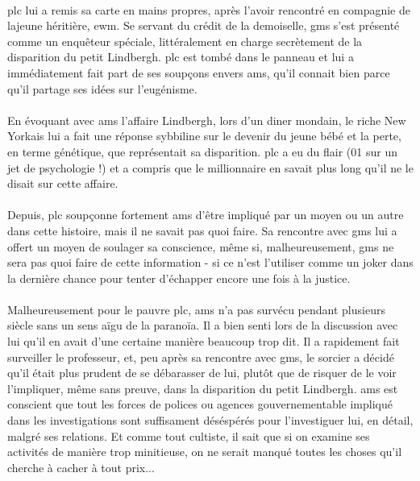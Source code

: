 \paragraph{} \gls{plc} lui a remis sa carte en mains propres, après l'avoir rencontré en compagnie de lajeune héritière, \gls{ewm}. Se 
servant du crédit de la demoiselle, \gls{gms} s'est présenté comme un enquêteur spéciale, littéralement en charge secrètement de la 
disparition du petit Lindbergh. \gls{plc} est tombé dans le panneau et lui a immédiatement fait part de ses soupçons envers \gls{ams}, 
qu'il connait bien parce qu'il partage ses idées sur l'eugénisme.

\paragraph{} En évoquant avec \gls{ams} l'affaire Lindbergh, lors d'un diner mondain, le riche New Yorkais lui a fait une réponse sybbiline
sur le devenir du jeune bébé et la perte, en terme génétique, que représentait sa disparition. \gls{plc} a eu du flair (01 sur un jet de 
psychologie !) et a compris que le millionnaire en savait plus long qu'il ne le disait sur cette affaire.

\paragraph{} Depuis, \gls{plc} soupçonne fortement \gls{ams} d'être impliqué par un moyen ou un autre dans cette histoire, mais il ne
savait pas quoi faire. Sa rencontre avec \gls{gms} lui a offert un moyen de soulager sa conscience, même si, malheureusement, \gls{gms} ne 
sera pas quoi faire de cette information - si ce n'est l'utiliser comme un joker dans la dernière chance pour tenter d'échapper encore une
fois à la justice.

\paragraph{} Malheureusement pour le pauvre \gls{plc}, \gls{ams} n'a pas survécu pendant plusieurs siècle sans un sens aïgu de la paranoïa.
Il a bien senti lors de la discussion avec lui qu'il en avait d'une certaine manière beaucoup trop dit. Il a rapidement fait surveiller le
professeur, et, peu après sa rencontre avec \gls{gms}, le sorcier a décidé qu'il était plus prudent de se débarasser de lui, plutôt que de
risquer de le voir l'impliquer, même sans preuve, dans la disparition du petit Lindbergh. \gls{ams} est conscient que tout les forces de 
polices ou agences gouvernementable impliqué dans les investigations sont suffisament déséspérés pour l'investiguer lui, en détail, malgré
ses relations. Et comme tout cultiste, il sait que si on examine ses activités de manière trop minitieuse, on ne serait manqué toutes les
choses qu'il cherche à cacher à tout prix...

